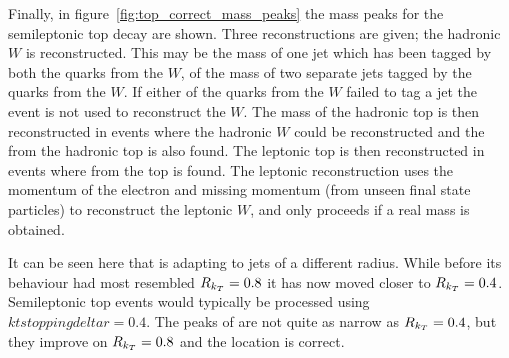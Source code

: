 Finally, in figure~\ref{fig:top_correct_mass_peaks} the mass peaks for the semileptonic top decay are shown.
Three reconstructions are given; the hadronic \(W\) is reconstructed.
This may be the mass of one jet which has been tagged by both the quarks from the \(W\),
of the mass of two separate jets tagged by the quarks from the \(W\).
If either of the quarks from the \(W\) failed to tag a jet the event is not used to reconstruct the \(W\).
The mass of the hadronic top is then reconstructed in events where the hadronic \(W\) could be reconstructed and the 
from the hadronic top is also found.
The leptonic top is then reconstructed in events where  from the top is found.
The leptonic reconstruction uses the momentum of the electron and missing momentum (from unseen final state particles)
to reconstruct the leptonic \(W\), and only proceeds if a real mass is obtained.

It can be seen here that \spectral{} is adapting to jets of a different radius.
While before its behaviour had most resembled \(R_{k_T}{} = 0.8\)
it has now moved closer to \(R_{k_T}{} = 0.4\).
Semileptonic top events would typically be processed using \(ktstoppingdeltar{} = 0.4\).
The peaks of \spectral{} are not quite as narrow as \(R_{k_T}{} = 0.4\),
but they improve on \(R_{k_T}{} = 0.8\) and the location is correct.

%



